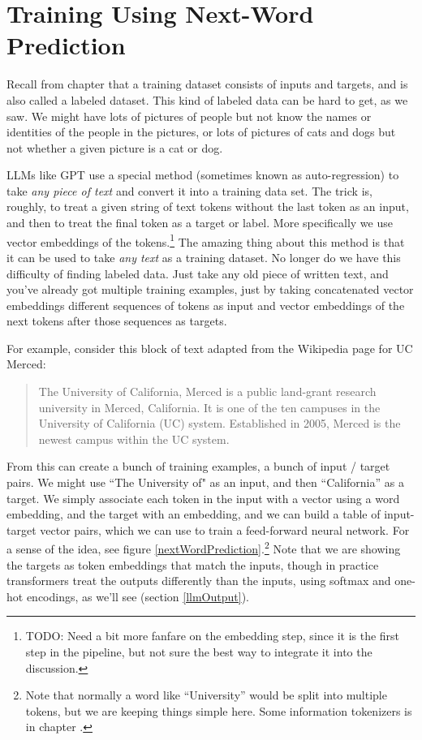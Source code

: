 \section{Training Using Next-Word Prediction}

Recall from chapter  that a training dataset consists of inputs and targets, and is also called a labeled dataset. This kind of labeled data can be hard to get, as we saw.  We might have lots of pictures of people but not know the names or identities of the people in the pictures, or lots of pictures of cats and dogs but not whether a given picture is a cat or dog. 

LLMs like GPT use a special method (sometimes known as auto-regression) to take \emph{any piece of text} and convert it into a training data set. The trick is, roughly, to treat a given string of text tokens without the last token as an input, and then to treat the final token as a target or label. More specifically we use vector embeddings of the tokens.\footnote{TODO: Need a bit more fanfare on the embedding step, since it is the first step in the pipeline, but not sure the best way to integrate it into the discussion.} The amazing thing about this method is that it can be used to take \emph{any text} as a training dataset. No longer do we have this difficulty of finding labeled data. Just take any old piece of written text, and you've already got multiple training examples, just by taking concatenated vector embeddings different sequences of tokens as input and vector embeddings of the next tokens after those sequences as targets.

For example, consider this block of text adapted from the Wikipedia page for UC Merced:

\begin{quote}
The University of California, Merced is a public land-grant research university in Merced, California. It is one of the ten campuses in the University of California (UC) system. Established in 2005, Merced is the newest campus within the UC system.
\end{quote}

From this can create a bunch of training examples, a bunch of input / target pairs. We might use ``The University of" as an input, and then ``California'' as a target.  We simply associate each token in the input with a vector using a word embedding, and the target with an embedding, and we can build a table of input-target vector pairs, which we can use to train a feed-forward neural network.   For a sense of the idea, see figure \ref{nextWordPrediction}.\footnote{Note that normally a word like ``University'' would be split into multiple tokens, but we are keeping things simple here. Some information tokenizers is in chapter .}  Note that we are showing the targets as token embeddings that match the inputs, though in practice transformers treat the outputs differently than the inputs, using softmax and one-hot encodings, as we'll see (section \ref{llmOutput}).

